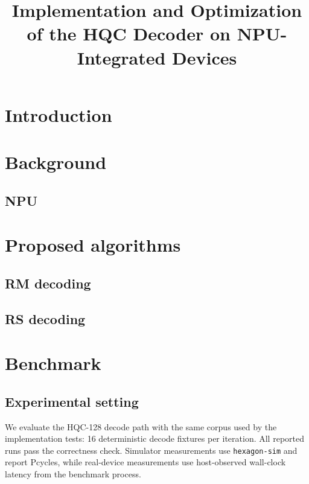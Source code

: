 \documentclass[runningheads]{llncs}
\title{Implementation and Optimization of the HQC Decoder on NPU-Integrated Devices}
\author{}
\date{}
\begin{document}
\maketitle

\begin{abstract}
        
\end{abstract}

\section{Introduction}


\section{Background}



\subsection{NPU}



\section{Proposed algorithms}


\subsection{RM decoding}

\subsection{RS decoding}


 
\section{Benchmark}

\subsection{Experimental setting}

We evaluate the HQC-128 decode path with the same corpus used by the
implementation tests: 16 deterministic decode fixtures per iteration.  All
reported runs pass the correctness check.  Simulator measurements use
\texttt{hexagon-sim} and report Pcycles, while real-device measurements use
host-observed wall-clock latency from the benchmark process.
\end{document}
